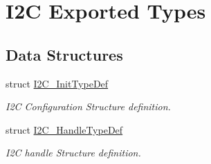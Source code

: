 \hypertarget{group___i2_c___exported___types}{}\section{I2C Exported Types}
\label{group___i2_c___exported___types}
\subsection*{Data Structures}
\begin{DoxyCompactItemize}
\item 
struct \hyperlink{struct_i2_c___init_type_def}{I2\+C\+\_\+\+Init\+Type\+Def}
\begin{DoxyCompactList}\small\item\em I2C Configuration Structure definition. \end{DoxyCompactList}\item 
struct \hyperlink{struct_i2_c___handle_type_def}{I2\+C\+\_\+\+Handle\+Type\+Def}
\begin{DoxyCompactList}\small\item\em I2C handle Structure definition. \end{DoxyCompactList}\end{DoxyCompactItemize}
